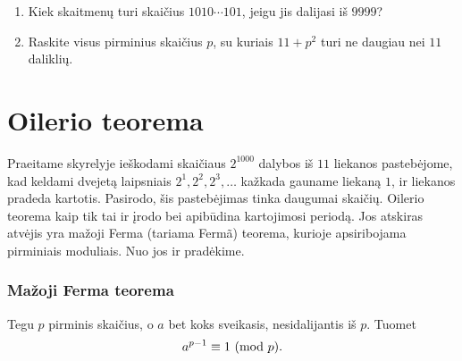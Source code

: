 \begin{enumerate}
  \item \text{[LitMo 1988]} Kiek skaitmenų turi skaičius $1010\cdots101$,
    jeigu jis dalijasi iš $9999$?
  \item Raskite visus pirminius skaičius $p$, su kuriais $11 + p^2$ turi
    ne daugiau nei $11$ daliklių.
\end{enumerate}

\newpage
\section{Oilerio teorema}

Praeitame skyrelyje ieškodami skaičiaus $2^{1000}$ dalybos iš $11$ liekanos
pastebėjome, kad keldami dvejetą laipsniais $2^1, 2^2, 2^3, \dots$ kažkada
gauname liekaną $1$, ir liekanos pradeda kartotis. Pasirodo, šis
pastebėjimas tinka daugumai skaičių. Oilerio teorema kaip tik tai ir įrodo
bei apibūdina kartojimosi periodą.  Jos atskiras atvėjis yra mažoji Ferma
(tariama Ferm\~{a}) teorema, kurioje apsiribojama pirminiais moduliais. Nuo
jos ir pradėkime. 

\subsubsection{Mažoji Ferma teorema}

\begin{thm}
  Tegu $p$ pirminis skaičius, o $a$ bet koks sveikasis, nesidalijantis iš
  $p$. Tuomet 
  $$a^{p-1} \equiv 1 \ (\text{mod } p).$$
\end{thm}


